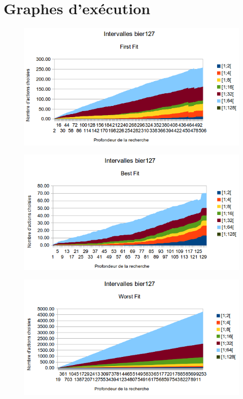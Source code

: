 \documentclass[a4paper,10pt]{report}
\begin{document}
\pagebreak
\section{Graphes d'exécution}


\begin{figure}[h]
  \begin{center}
    \includegraphics[width=\textwidth]{images/bier127-intervals-first-fit.png}
  \end{center}
\end{figure}

\begin{figure}[h]
  \begin{center}
    \includegraphics[width=\textwidth]{images/bier127-intervals-best-fit.png}
  \end{center}
\end{figure}

\begin{figure}[h]
  \begin{center}
    \includegraphics[width=\textwidth]{images/bier127-intervals-worst-fit.png}
  \end{center}
\end{figure}
\end{document}
